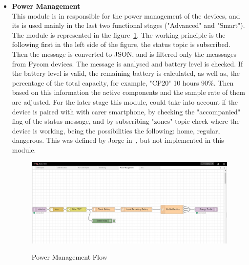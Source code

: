 \begin{itemize}
   \item \textbf{Power Management}\\
   This module is in responsible for the power management of the devices, and its is used mainly in the last two functional stages ("Advanced"  and "Smart"). The module is represented in the figure~\ref{fig:Power_Management}. The working principle is the following first in the left side of the figure, the status topic is subscribed. Then the message is converted to JSON, and is filtered only the meassages from Pycom devices. The message is analysed and battery level is checked. If the battery level is valid, the remaining battery is calculated, as well as, the percentage of the total capacity, for example, "CP20" 10 hours 90\%. Then based on this information the active components and the sample rate of them are adjusted. For the later stage this module, could take into account if the device is paired with with carer smartphone, by checking the "accompanied" flag of the status message, and by subscribing "zones" topic check where the device is working, being the possibilities the following: home, regular, dangerous. This was defined by Jorge in~\cite{githuMQTT}, but not implemented in this module.
    \begin{figure}[htbp]
      \centering
      
        {\includegraphics[width=0.9\linewidth]{Chapters/Figures/PowerManagement.JPG}}
     
      \caption{Power Management Flow}
      \label{fig:Power_Management}
    \end{figure}
 
\end{itemize}

